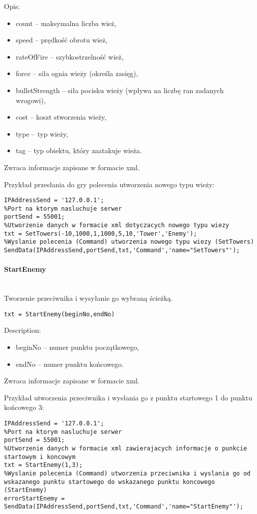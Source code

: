Opis:
\begin{itemize}
\item count -- maksymalna liczba wież,
\item speed -- prędkość obrotu wież,
\item rateOfFire -- szybkostrzelność wież,
\item force -- siła ognia wieży (określa zasięg),
\item bulletStrength -- siła pocisku wieży (wpływa na liczbę ran zadanych wrogowi),
\item cost -- koszt stworzenia wieży,
\item type -- typ wieży,
\item tag -- typ obiektu, który zaatakuje wieża.
\end{itemize}

Zwraca informacje zapisane w formacie xml.

Przykład przesłania do gry polecenia utworzenia nowego typu wieży:
\begin{lstlisting}[style=Matlab-editor]
%Adres serwera
IPAddressSend = '127.0.0.1';
%Port na ktorym nasluchuje serwer
portSend = 55001;
%Utworzenie danych w formacie xml dotyczacych nowego typu wiezy
txt = SetTowers(-10,1000,1,1000,5,10,'Tower','Enemy');
%Wyslanie polecenia (Command) utworzenia nowego typu wiezy (SetTowers)
SendData(IPAddressSend,portSend,txt,'Command','name="SetTowers"');
\end{lstlisting}

\paragraph{StartEnemy} \hspace{0pt} \\

Tworzenie przeciwnika i wysyłanie go wybraną ścieżką.
\begin{lstlisting}[style=Matlab-editor]
txt = StartEnemy(beginNo,endNo)
\end{lstlisting}

Description:
\begin{itemize}
\item beginNo -- numer punktu początkowego,
\item endNo -- numer punktu końcowego.
\end{itemize}

Zwraca informacje zapisane w formacie xml.

Przykład utworzenia przeciwnika i wysłania go z punktu startowego 1 do punktu końcowego 3: 
\begin{lstlisting}[style=Matlab-editor]
%Adres serwera
IPAddressSend = '127.0.0.1';
%Port na ktorym nasluchuje serwer
portSend = 55001;
%Utworzenie danych w formacie xml zawierajacych informacje o punkcie startowym i koncowym
txt = StartEnemy(1,3);
%Wyslanie polecenia (Command) utworzenia przeciwnika i wyslania go od wskazanego punktu startowego do wskazanego punktu koncowego (StartEnemy)
errorStartEnemy = SendData(IPAddressSend,portSend,txt,'Command','name="StartEnemy"');
\end{lstlisting}

